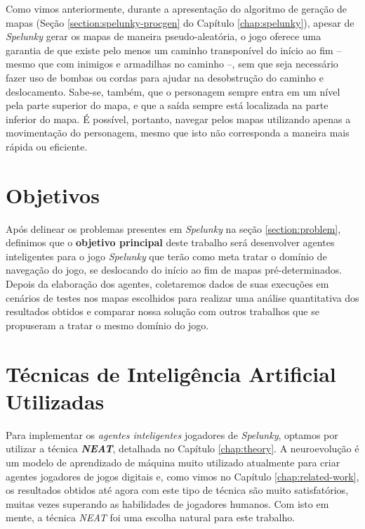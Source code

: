 Como vimos anteriormente, durante a apresentação do algoritmo de geração de
mapas (Seção \ref{section:spelunky-procgen} do Capítulo \ref{chap:spelunky}),
apesar de \textit{Spelunky} gerar os mapas de maneira pseudo-aleatória, o jogo
oferece uma garantia de que existe pelo menos um caminho transponível do início
ao fim -- mesmo que com inimigos e armadilhas no caminho --, sem que seja
necessário fazer uso de bombas ou cordas para ajudar na desobstrução do caminho
e deslocamento. Sabe-se, também, que o personagem sempre entra em um nível pela
parte superior do mapa, e que a saída sempre está localizada na parte inferior
do mapa. É possível, portanto, navegar pelos mapas utilizando apenas a
movimentação do personagem, mesmo que isto não corresponda a maneira mais rápida
ou eficiente.


\section{\label{section:objectives}Objetivos}
Após delinear os problemas presentes em \textit{Spelunky} na seção
\ref{section:problem}, definimos que o \textbf{objetivo principal} deste
trabalho será desenvolver agentes inteligentes para o jogo \textit{Spelunky} que
terão como meta tratar o domínio de navegação do jogo, se deslocando do início
ao fim de mapas pré-determinados. Depois da elaboração dos agentes, coletaremos
dados de suas execuções em cenários de testes nos mapas escolhidos para realizar
uma análise quantitativa dos resultados obtidos e comparar nossa solução com
outros trabalhos que se propuseram a tratar o mesmo domínio do jogo.


\section{\label{section:techniques}Técnicas de Inteligência Artificial
Utilizadas}
Para implementar os \textit{agentes inteligentes} jogadores de
\textit{Spelunky}, optamos por utilizar a técnica \textbf{\textit{NEAT}},
detalhada no Capítulo \ref{chap:theory}. A neuroevolução é um modelo de
aprendizado de máquina muito utilizado atualmente para criar agentes jogadores
de jogos digitais\cite{DBLP:journals/corr/RisiT14} e, como vimos no Capítulo
\ref{chap:related-work}, os resultados obtidos até agora com este tipo de
técnica são muito satisfatórios, muitas vezes superando as habilidades de
jogadores humanos\cite{NeuroEvolutionAtari}. Com isto em mente, a técnica
\textit{NEAT} foi uma escolha natural para este trabalho.

